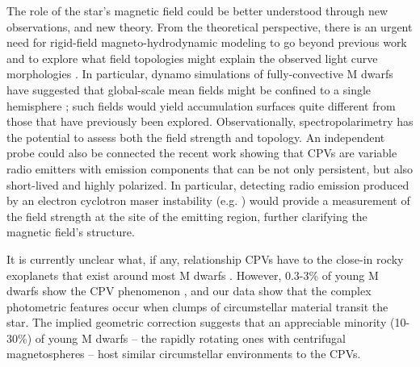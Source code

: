 \documentclass{nature3}
\begin{document}
The role of the star's magnetic field could be better understood
through new observations, and new theory.  From the theoretical
perspective, there is an urgent need for rigid-field
magneto-hydrodynamic modeling to go beyond previous work
\cite{Townsend2005,Townsend2008,Krticka2022} and to explore what field
topologies might explain the observed light curve morphologies
\cite{Bouma2024}.  In particular, dynamo simulations of
fully-convective M dwarfs have suggested that global-scale mean fields
might be confined to a single hemisphere \cite{Brown2020}; such fields
would yield accumulation surfaces quite different from those that have
previously been explored.  Observationally, spectropolarimetry has the
potential to assess both the field strength and topology.  An
independent probe could also be connected the recent work
\cite{Kaur2024} showing that CPVs are variable radio emitters with
emission components that can be not only persistent, but also
short-lived and highly polarized.  In particular, detecting radio
emission produced by an electron cyclotron maser instability (e.g.
\cite{Callingham2021}) would provide a measurement of the field
strength at the site of the emitting region, further clarifying the
magnetic field's structure.


It is currently unclear what, if any, relationship CPVs have to the
close-in rocky exoplanets that exist around most M dwarfs
\cite{Dressing2015}.  However, 0.3-3\% of young M dwarfs show the CPV
phenomenon \cite{Rebull2020}, and our data show that the complex
photometric features occur when clumps of circumstellar material
transit the star.  The implied geometric correction suggests that an
appreciable minority (10-30\%) of young M dwarfs -- the rapidly
rotating ones with centrifugal magnetospheres -- host similar
circumstellar environments to the CPVs.




\end{document}
